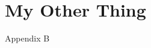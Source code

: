 \pagestyle{plain}
\appendix
\setcounter{chapter}{1}

\chapter{My Other Thing}
\renewcommand{\thetable}{\Alph{chapter}.\arabic{table}}  
\renewcommand{\thefigure}{\Alph{chapter}.\arabic{figure}} 

Appendix B